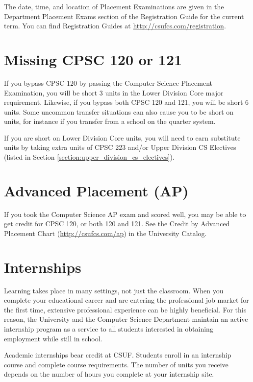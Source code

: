 \documentclass{book}
\newcommand{\CampusName}{CSUF}
\newcommand{\shrunkurl}[1]{\url{http://csufcs.com/#1}}
\begin{document}
The date, time, and location of Placement Examinations are given in the Department Placement Exams section of the Registration Guide for the current term. You can find Registration Guides at \shrunkurl{registration}.

\section{Missing CPSC 120 or 121}

If you bypass CPSC 120 by passing the Computer Science Placement Examination, you will be short 3 units in the Lower Division Core major requirement. Likewise, if you bypass both CPSC 120 and 121, you will be short 6 units. Some uncommon transfer situations can also cause you to be short on units, for instance if you transfer from a school on the quarter system.

If you are short on Lower Division Core units, you will need to earn substitute units by
taking extra units of CPSC 223 and/or Upper Division CS Electives (listed in Section
\ref{section:upper_division_cs_electives}).


\section{Advanced Placement (AP)}
\label{section:ap}
If you took the Computer Science AP exam and scored well, you may be able to get credit for CPSC 120, or both 120 and 121. See the Credit by Advanced Placement Chart (\shrunkurl{ap}) in the University Catalog.

\section{Internships}

Learning takes place in many settings, not just the classroom. When you complete your educational career and are entering the professional job market for the first time, extensive professional experience can be highly beneficial. For this reason, the University and the Computer Science Department maintain an active internship program as a service to all students interested in obtaining employment while still in school.

Academic internships bear credit at \CampusName. Students enroll in an internship course and complete course requirements. The number of units you receive depends on the number of hours you complete at your internship site.
\end{document}
